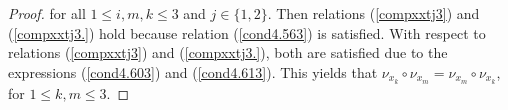 \documentclass[10pt,a4paper]{amsart}
\begin{document}
\begin{proof}
for all $1\leq i,m,k  \leq 3$ and $j \in \{1, 2\}$. Then relations {\rm (}\ref{compxxtj3}{\rm )} and {\rm (}\ref{compxxtj3.}{\rm )} hold because relation {\rm (}\ref{cond4.563}{\rm )} is satisfied. With respect to relations {\rm (}\ref{compxxtj3}{\rm )} and {\rm (}\ref{compxxtj3.}{\rm )}, both are satisfied due to the expressions {\rm (}\ref{cond4.603}{\rm )} and {\rm (}\ref{cond4.613}{\rm )}. This yields that $\nu_{x_k} \circ \nu_{x_m} = \nu_{x_m} \circ \nu_{x_k}$, for  $1\leq k, m \leq 3$.
\end{proof}
\end{document}
